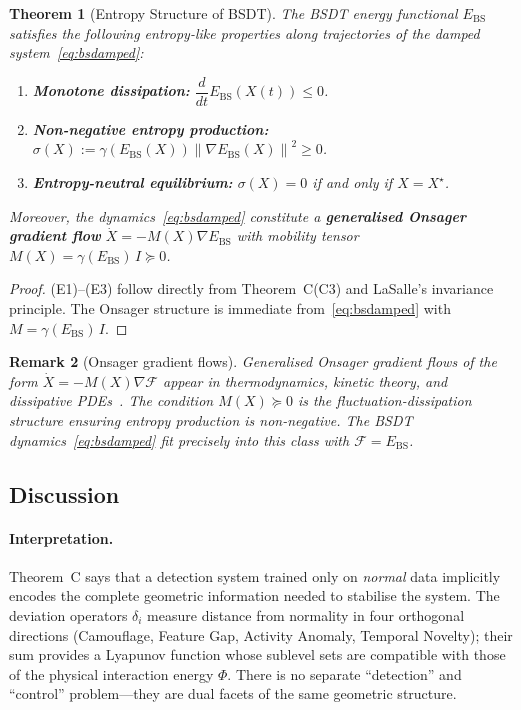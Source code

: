 \documentclass[11pt]{article}
\newtheorem{theorem}{Theorem}[section]
\newtheorem{remark}[theorem]{Remark}
\theoremstyle{definition}
\newcommand{\Xst}{X^{\star}}
\newcommand{\grad}{\nabla}
\newcommand{\Ebs}{E_{\mathrm{BS}}}
\newcommand{\norm}[1]{\left\|#1\right\|}
\begin{document}
\begin{theorem}[Entropy Structure of BSDT]
\label{thm:entropy}
The BSDT energy functional $\Ebs$ satisfies the following entropy-like
properties along trajectories of the damped system~\eqref{eq:bsdamped}:
\begin{enumerate}
  \item[\textup{(E1)}] \textbf{Monotone dissipation:}
    $\dfrac{d}{dt}\Ebs(X(t)) \le 0$.
  \item[\textup{(E2)}] \textbf{Non-negative entropy production:}
    $\sigma(X) := \gamma(\Ebs(X))\norm{\grad\Ebs(X)}^2 \ge 0$.
  \item[\textup{(E3)}] \textbf{Entropy-neutral equilibrium:}
    $\sigma(X) = 0$ if and only if $X = \Xst$.
\end{enumerate}
Moreover, the dynamics~\eqref{eq:bsdamped} constitute a
\textbf{generalised Onsager gradient flow}
$\dot{X} = -M(X)\grad\Ebs$ with mobility tensor
$M(X) = \gamma(\Ebs)\,I \succeq 0$.
\end{theorem}

\begin{proof}
(E1)--(E3) follow directly from Theorem~C(C3) and LaSalle's invariance
principle.  The Onsager structure is immediate from~\eqref{eq:bsdamped}
with $M = \gamma(\Ebs)\,I$.
\end{proof}

\begin{remark}[Onsager gradient flows]
\label{rem:onsager}
Generalised Onsager gradient flows of the form
$\dot{X} = -M(X)\nabla\mathcal{F}$ appear in thermodynamics, kinetic theory,
and dissipative PDEs~\cite{JKO1998}.  The condition $M(X) \succeq 0$ is the
fluctuation-dissipation structure ensuring entropy production is non-negative.
The BSDT dynamics~\eqref{eq:bsdamped} fit precisely into this class with
$\mathcal{F} = \Ebs$.
\end{remark}

\subsection{Discussion}
\label{sec:equiv:disc}

\paragraph{Interpretation.}
Theorem~C says that a detection system trained only on \emph{normal} data implicitly
encodes the complete geometric information needed to stabilise the system.  The
deviation operators $\delta_i$ measure distance from normality in four orthogonal
directions (Camouflage, Feature Gap, Activity Anomaly, Temporal Novelty); their
sum provides a Lyapunov function whose sublevel sets are compatible with those
of the physical interaction energy $\Phi$.  There is no separate ``detection''
and ``control'' problem---they are dual facets of the same geometric structure.
\end{document}
